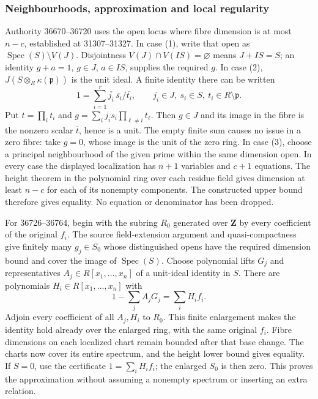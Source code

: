 \subsubsection{Neighbourhoods, approximation and local regularity}\label{algebra-proof-046-neighbourhoods-approximation-and-local-regularity}

Authority 36670--36720 uses the open locus where fibre dimension is at most \(n-c\), established at 31307--31327. In case (1), write that open as \(\operatorname{Spec}(S)\setminus V(J)\). Disjointness \(V(J)\cap V(IS)=\varnothing\) means \(J+IS=S\); an identity \(g+a=1\), \(g\in J\), \(a\in IS\), supplies the required \(g\). In case (2), \(J(S\otimes_R\kappa(\mathfrak p))\) is the unit ideal. A finite identity there can be written \[
1=\sum_{i=1}^r \overline{j_i}\,\overline{s_i}/\overline{t_i},
\qquad j_i\in J,\ s_i\in S,\ t_i\in R\setminus\mathfrak p.
\] Put \(t=\prod_i t_i\) and \(g=\sum_i j_i s_i\prod_{\ell\ne i}t_\ell\). Then \(g\in J\) and its image in the fibre is the nonzero scalar \(\overline t\), hence is a unit. The empty finite sum causes no issue in a zero fibre: take \(g=0\), whose image is the unit of the zero ring. In case (3), choose a principal neighbourhood of the given prime within the same dimension open. In every case the displayed localization has \(n+1\) variables and \(c+1\) equations. The height theorem in the polynomial ring over each residue field gives dimension at least \(n-c\) for each of its nonempty components. The constructed upper bound therefore gives equality. No equation or denominator has been dropped.

For 36726--36764, begin with the subring \(R_0\) generated over \(\mathbf Z\) by every coefficient of the original \(f_i\). The source field-extension argument and quasi-compactness give finitely many \(g_j\in S_0\) whose distinguished opens have the required dimension bound and cover the image of \(\operatorname{Spec}(S)\). Choose polynomial lifts \(G_j\) and representatives \(A_j\in R[x_1,\ldots,x_n]\) of a unit-ideal identity in \(S\). There are polynomials \(H_i\in R[x_1,\ldots,x_n]\) with \[
1-\sum_j A_jG_j=\sum_i H_i f_i.
\] Adjoin every coefficient of all \(A_j,H_i\) to \(R_0\). This finite enlargement makes the identity hold already over the enlarged ring, with the same original \(f_i\). Fibre dimensions on each localized chart remain bounded after that base change. The charts now cover its entire spectrum, and the height lower bound gives equality. If \(S=0\), use the certificate \(1=\sum_i H_i f_i\); the enlarged \(S_0\) is then zero. This proves the approximation without assuming a nonempty spectrum or inserting an extra relation.

